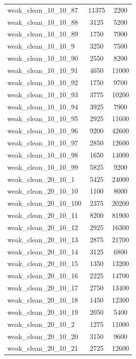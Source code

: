 \begin{longtable}{lcc}
weak\_clean\_10\_10\_87    &    11375 &   2200 \\
weak\_clean\_10\_10\_88    &     3125 &   5200 \\
weak\_clean\_10\_10\_89    &     1750 &   7900 \\
weak\_clean\_10\_10\_9     &     3250 &   7500 \\
weak\_clean\_10\_10\_90    &     2550 &   8200 \\
weak\_clean\_10\_10\_91    &     4650 &  11000 \\
weak\_clean\_10\_10\_92    &     1750 &   9700 \\
weak\_clean\_10\_10\_93    &     3775 &  10200 \\
weak\_clean\_10\_10\_94    &     3925 &   7900 \\
weak\_clean\_10\_10\_95    &     2925 &  11600 \\
weak\_clean\_10\_10\_96    &     9200 &  42600 \\
weak\_clean\_10\_10\_97    &     2850 &  12600 \\
weak\_clean\_10\_10\_98    &     1650 &  14000 \\
weak\_clean\_10\_10\_99    &     5825 &   9200 \\
weak\_clean\_20\_10\_1     &     5425 &  24000 \\
weak\_clean\_20\_10\_10    &     1100 &   8000 \\
weak\_clean\_20\_10\_100   &     2375 &  20200 \\
weak\_clean\_20\_10\_11    &     8200 &  81900 \\
weak\_clean\_20\_10\_12    &     2925 &  16300 \\
weak\_clean\_20\_10\_13    &     2875 &  21700 \\
weak\_clean\_20\_10\_14    &     3125 &   6800 \\
weak\_clean\_20\_10\_15    &     1350 &  13200 \\
weak\_clean\_20\_10\_16    &     2225 &  14700 \\
weak\_clean\_20\_10\_17    &     2750 &  13400 \\
weak\_clean\_20\_10\_18    &     1450 &  12300 \\
weak\_clean\_20\_10\_19    &     2050 &   5400 \\
weak\_clean\_20\_10\_2     &     1275 &  11000 \\
weak\_clean\_20\_10\_20    &     3150 &   9600 \\
weak\_clean\_20\_10\_21    &     2725 &  12600 \\

\end{longtable}

